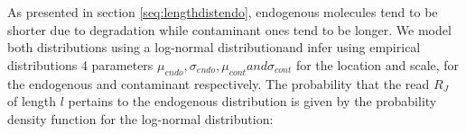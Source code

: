 \documentclass[a4paper,12pt]{article}
\begin{document}




%
%
%
%
%
%
%
%
%

As presented in section \ref{seq:lengthdistendo}, endogenous molecules tend to be shorter due to degradation while contaminant ones tend to be longer. We model both distributions using a log-normal distributionand infer using empirical distributions 4 parameters $\mu_{endo}, \sigma_{endo}, \mu_{cont} and \sigma_{cont}$ for the location and scale, for the endogenous and contaminant respectively. The probability that the read $R_J$ of length $l$ pertains to the endogenous distribution is given by the probability density function for the log-normal distribution:
\end{document}
